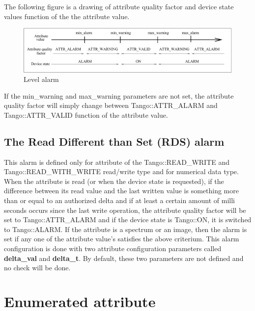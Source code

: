 The following figure is a drawing of attribute quality factor and
device state values function of the the attribute value.

\begin{figure}[H]
\begin{centering}
\includegraphics[scale=0.5]{advanced/alarm}
\par\end{centering}
\caption{Level alarm\label{alarm_fig}}
\end{figure}

If the min\_warning and max\_warning parameters are not set, the attribute
quality factor will simply change between Tango::ATTR\_ALARM and Tango::ATTR\_VALID
function of the attribute value.

\subsection{The Read Different than Set (RDS) alarm}

This alarm is defined only for attribute of the Tango::READ\_WRITE
and Tango::READ\_WITH\_WRITE read/write type and for numerical data
type. When the attribute is read (or when the device state is requested),
if the difference between its read value and the last written value
is something more than or equal to an authorized delta and if at least
a certain amount of milli seconds occurs since the last write operation,
the attribute quality factor will be set to Tango::ATTR\_ALARM
and if the device state is Tango::ON, it is switched to Tango::ALARM.
If the attribute is a spectrum or an image, then the alarm is set
if any one of the attribute value's satisfies the above criterium.
This alarm configuration is done with two attribute configuration
parameters called \textbf{delta\_val} and \textbf{delta\_t}.
By default, these two parameters are not defined and no check will
be done.

\section{Enumerated attribute}

